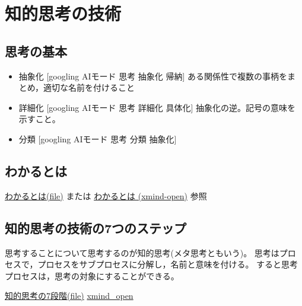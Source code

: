 \documentclass[dvipdfmx,11pat]{jarticle}
\begin{document}
\section{知的思考の技術}
\label{sec:orgc698686}
\subsection{思考の基本}
\label{sec:org210ef07}
\begin{itemize}
\item 抽象化 [googling AIモード 思考 抽象化 帰納]
ある関係性で複数の事柄をまとめ，適切な名前を付けること

\item 詳細化 [googling AIモード 思考 詳細化  具体化]
抽象化の逆。記号の意味を示すこと。

\item 分類 [googling AIモード 思考 分類 抽象化]
\end{itemize}
\subsection{わかるとは}
\label{sec:org993c7ec}
\href{../Maps/わかるとは.xmind}{わかるとは(file)} または
\href{shell:xmind ../Maps/わかるとは.xmind}{わかるとは (xmind-open)}
参照
\subsection{知的思考の技術の7つのステップ}
\label{sec:orgd6f19a4}
思考することについて思考するのが知的思考(メタ思考ともいう)。
思考はプロセスで，プロセスをサブプロセスに分解し，名前と意味を付ける。
すると思考プロセスは，思考の対象にすることができる。

\href{../Maps/知的思考の7段階.xmind}{知的思考の7段階(file)} \href{shell:xmind ../Maps/知的思考の7段階.xmind}{xmind\_open}
\end{document}
